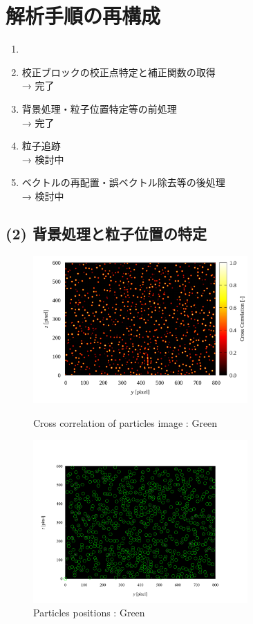 \documentclass[twocolumn,a4j]{jsarticle}
\begin{document}
\section{解析手順の再構成}

\begin{enumerate}[(1)]
  \item [] \textgt{[ 全体の流れ ]}
  \item 校正ブロックの校正点特定と補正関数の取得 \\→ 完了
  \item 背景処理・粒子位置特定等の前処理 \\→ 完了
  \item 粒子追跡 \\→ 検討中
  \item ベクトルの再配置・誤ベクトル除去等の後処理 \\→ 検討中
\end{enumerate}

\newpage
\subsection{(2) 背景処理と粒子位置の特定}

\begin{figure}[htbp]
  \includegraphics[keepaspectratio, width=82mm]{../images/cross_crr_particle.png}
  \caption{Cross correlation of particles image : Green}
  \includegraphics[keepaspectratio, width=82mm]{../images/particle_positions_green.png}
  \caption{Particles positions : Green}
\end{figure}
\end{document}
